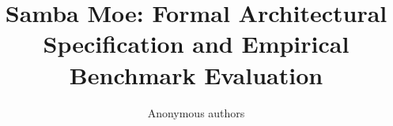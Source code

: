 \title{\textbf{Samba Moe: Formal Architectural Specification and Empirical Benchmark Evaluation}}

\author{Anonymous authors}
